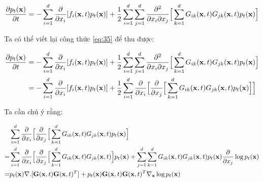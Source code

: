 \documentclass{article} %
\begin{document}
\begin{equation} \label{eq:35}
    \dfrac{\partial p_t(\bold{x})}{\partial t} = - \sum_{i=1}^d \dfrac{\partial}{\partial x_i} \lbrack f_i (\bold{x}, t)p_t(\bold{x}) \rbrack + \dfrac{1}{2} \sum_{i=1}^d \sum_{j=1}^d \dfrac{\partial^2}{\partial x_i \partial x_j} \Big \lbrack \sum_{k=1}^d G_{ik} (\bold{x}, t) G_{jk}(\bold{x}, t) p_t (\bold{x}) \Big \rbrack
\end{equation}

Ta có thể viết lại công thức \ref{eq:35} để thu được:

\begin{equation} \label{eq:36}
    \begin{aligned}
        \dfrac{\partial p_t(\bold{x})}{\partial t} &= - \sum_{i=1}^d \dfrac{\partial}{\partial x_i} \lbrack f_i (\bold{x}, t)p_t(\bold{x}) \rbrack + \dfrac{1}{2} \sum_{i=1}^d \sum_{j=1}^d \dfrac{\partial^2}{\partial x_i \partial x_j} \Big \lbrack \sum_{k=1}^d G_{ik} (\bold{x}, t) G_{jk}(\bold{x}, t) p_t (\bold{x}) \Big \rbrack \\
        &= - \sum_{i=1}^d \dfrac{\partial}{\partial x_i} \lbrack f_i (\bold{x}, t)p_t(\bold{x}) \rbrack + \dfrac{1}{2} \sum_{i=1}^d \dfrac{\partial}{\partial x_i} \Big \lbrack \dfrac{\partial}{\partial x_j} \Big \lbrack \sum_{k=1}^d G_{ik} (\bold{x}, t) G_{jk}(\bold{x}, t) p_t (\bold{x}) \Big \rbrack \Big \rbrack
    \end{aligned}
\end{equation}

Ta cần chú ý rằng:

\begin{equation*}
    \begin{aligned}
        &\sum_{i=1}^d \dfrac{\partial}{\partial x_i} \Big \lbrack \dfrac{\partial}{\partial x_j} \Big \lbrack \sum_{k=1}^d G_{ik} (\bold{x}, t) G_{jk}(\bold{x}, t) p_t (\bold{x}) \Big \rbrack \\
        =& \sum_{i=1}^d \dfrac{\partial}{\partial x_i} \Big \lbrack \dfrac{\partial}{\partial x_j} \Big \lbrack \sum_{k=1}^d G_{ik} (\bold{x}, t) G_{jk}(\bold{x}, t) \Big \rbrack p_t (\bold{x}) + \sum_{j=1}^d \sum_{k=1}^d G_{ik}(\bold{x}, t) G_{jk}(\bold{x}, t) p_t(\bold{x}) \dfrac{\partial}{\partial x_j} \log p_t(\bold{x}) \\
        =& p_t(\bold{x}) \nabla . \lbrack \bold{G}(\bold{x}, t) \bold{G}(\bold{x}, t)^T \rbrack + p_t(\bold{x}) \bold{G}(\bold{x}, t) \bold{G}(\bold{x}, t)^T \nabla_{\bold{x}} \log p_t (\bold{x})
    \end{aligned}
\end{equation*}
\end{document}
